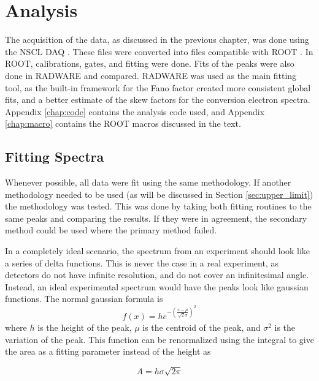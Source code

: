 \chapter{Analysis}
\label{ch:analysis}

The acquisition of the data, as discussed in the previous chapter, was done using the NSCL DAQ \citep{nscl:_daq, prokop14:_nsclddas}. These files were converted into files compatible with ROOT \citep{brun97:_root}. In ROOT, calibrations, gates, and fitting were done. Fits of the peaks were also done in RADWARE \citep{radford00:_radware} and compared. RADWARE was used as the main fitting tool, as the built-in framework for the Fano factor \citep{fano47:_factor} created more consistent global fits, and a better estimate of the skew factors for the conversion electron spectra. Appendix \ref{chap:code} contains the analysis code used, and Appendix \ref{chap:macro} contains the ROOT macros discussed in the text.

\section{Fitting Spectra}
\label{sec:fitting}

Whenever possible, all data were fit using the same methodology. If another methodology needed to be used (as will be discussed in Section \ref{sec:upper_limit}) the methodology was tested. This was done by taking both fitting routines to the same peaks and comparing the results. If they were in agreement, the secondary method could be used where the primary method failed.

In a completely ideal scenario, the spectrum from an experiment should look like a series of delta functions. This is never the case in a real experiment, as detectors do not have infinite resolution, and do not cover an infinitesimal angle. Instead, an ideal experimental spectrum would have the peaks look like gaussian functions. The normal gaussian formula is 
\begin{equation}
    f(x) = he^{-\left(\frac{x-\mu}{\sqrt{2}\sigma}\right)^2}
    \label{eq:gaus}
\end{equation}
where $h$ is the height of the peak, $\mu$ is the centroid of the peak, and $\sigma^2$ is the variation of the peak. This function can be renormalized using the integral to give the area as a fitting parameter instead of the height as 

\begin{equation}
    A = h\sigma\sqrt{2\pi}
\end{equation}

